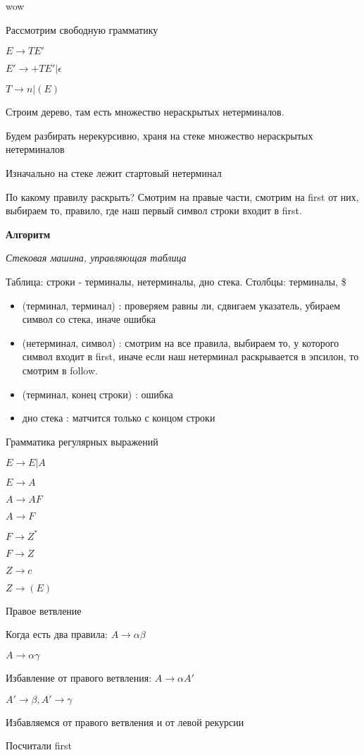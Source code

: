 
\begin{para}{wow}

Рассмотрим свободную грамматику

$E \rightarrow TE'$

$E' \rightarrow +TE'|\epsilon$

$T \rightarrow n | (E)$

Строим дерево, там есть множество нераскрытых нетерминалов.

Будем разбирать нерекурсивно, храня на стеке множество нераскрытых нетерминалов

Изначально на стеке лежит стартовый нетерминал

По какому правилу раскрыть? Смотрим на правые части, смотрим на first от них, выбираем то, правило, где наш первый символ строки входит в first.

\textbf{Алгоритм}

\textit{Стековая машина, управляющая таблица}

Таблица: строки - терминалы, нетерминалы, дно стека. Столбцы: терминалы, \$

\begin{itemize}

  \item (терминал, терминал) : проверяем равны ли, сдвигаем указатель, убираем символ со стека, иначе ошибка

  \item (нетерминал, символ) : смотрим на все правила, выбираем то, у которого символ входит в first, иначе если наш нетерминал раскрывается в эпсилон, то смотрим в follow.

  \item (терминал, конец строки) : ошибка
  
  \item дно стека : матчится только с концом строки

\end{itemize}

Грамматика регулярных выражений

$E \rightarrow E | A$

$E \rightarrow A$

$A \rightarrow AF$

$A \rightarrow F$

$F \rightarrow Z^*$

$F \rightarrow Z$

$Z \rightarrow c$

$Z \rightarrow (E)$

Правое ветвление

Когда есть два правила: $A \rightarrow \alpha \beta$

$A \rightarrow \alpha \gamma$

Избавление от правого ветвления: $A \rightarrow \alpha A'$

$A' \rightarrow \beta, A' \rightarrow \gamma$

Избавляемся от правого ветвления и от левой рекурсии

Посчитали first

\end{para}



